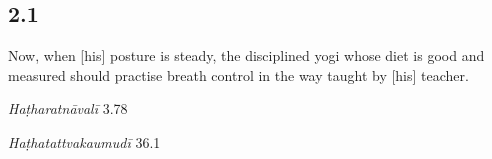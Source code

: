 

\pagestyle{HPed}
\begin{ekdosis}

\subsection*{2.1}
\begin{translation}[hp02_001] 
Now, when [his] posture is steady, the disciplined yogi whose diet is good and measured should practise breath control in the way taught by [his] teacher.
\end{translation}

\begin{sources}[hp02_001]
\end{sources}

\begin{testimonia}[hp02_001]
\emph{Haṭharatnāvalī} 3.78

\begin{versinnote}
\end{versinnote}

\emph{Haṭhatattvakaumudī} 36.1

\begin{versinnote}
\end{versinnote}


\end{testimonia}


\end{ekdosis}
